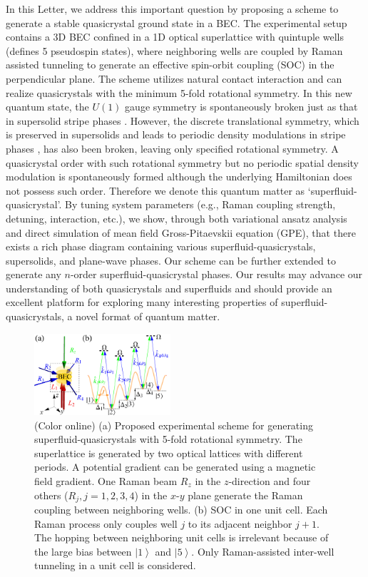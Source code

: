 \documentclass[twocolumn,prl,floatfix,citeautoscript,nofootinbib]{revtex4}
\begin{document}
In this Letter, we address this important question by proposing a scheme to
generate a stable quasicrystal ground state in a BEC. The experimental setup
contains a 3D BEC confined in a 1D optical superlattice with quintuple wells
(defines 5 pseudospin states), where neighboring wells are coupled by Raman
assisted tunneling to generate an effective spin-orbit coupling (SOC) \cite%
{Li2016, Li2017} in the perpendicular plane. The scheme utilizes natural
contact interaction and can realize quasicrystals with the minimum 5-fold
rotational symmetry. In this new quantum state, the $U(1)$ gauge symmetry is
spontaneously broken just as that in supersolid stripe phases \cite{Li2016,
Li2017}. However, the discrete translational symmetry, which is preserved in
supersolids and leads to periodic density modulations in stripe phases \cite%
{Li2016, Li2017}, has also been broken, leaving only specified rotational
symmetry. A quasicrystal order with such rotational symmetry but no periodic
spatial density modulation is spontaneously formed although the underlying
Hamiltonian does not possess such order. Therefore we denote this quantum
matter as `superfluid-quasicrystal'. By tuning system parameters (e.g.,
Raman coupling strength, detuning, interaction, etc.), we show, through both
variational ansatz analysis and direct simulation of mean field
Gross-Pitaevskii equation (GPE), that there exists a rich phase diagram
containing various superfluid-quasicrystals, supersolids, and plane-wave
phases. Our scheme can be further extended to generate any $n$-order
superfluid-quasicrystal phases. Our results may advance our understanding of
both quasicrystals and superfluids and should provide an excellent platform
for exploring many interesting properties of superfluid-quasicrystals, a
novel format of quantum matter.

\begin{figure}[t]
\centering
\includegraphics[width=0.45\textwidth]{Fig1.pdf}
\caption{(Color online) (a) Proposed experimental scheme for generating
superfluid-quasicrystals with 5-fold rotational symmetry. The superlattice
is generated by two optical lattices with different periods. A potential
gradient can be generated using a magnetic field gradient. One Raman beam $%
R_{z}$ in the $z$-direction and four others ($R_{j},j=1,2,3,4$) in the $x$-$%
y $ plane generate the Raman coupling between neighboring wells. (b) SOC in
one unit cell. Each Raman process only couples well $j$ to its adjacent
neighbor $j+1$. The hopping between neighboring unit cells is irrelevant
because of the large bias between $\left\vert 1\right\rangle $ and $%
\left\vert 5\right\rangle $. Only Raman-assisted inter-well tunneling in a
unit cell is considered.}
\label{fig1}
\end{figure}
\end{document}
